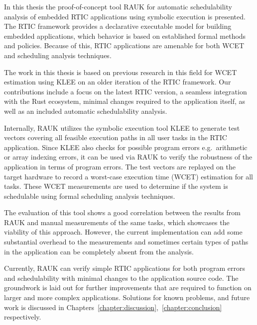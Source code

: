 In this thesis the proof-of-concept tool RAUK for automatic schedulability
analysis of embedded RTIC applications using symbolic execution is presented.
The RTIC framework provides a declarative executable model for building
embedded applications, which behavior is based on established formal methods
and policies. Because of this, RTIC applications are amenable for both WCET and
scheduling analysis techniques.

The work in this thesis is based on previous research in this field for WCET
estimation using KLEE on an older iteration of the RTIC framework. Our
contributions include a focus on the latest RTIC version, a seamless
integration with the Rust ecosystem, minimal changes required to the
application itself, as well as an included automatic schedulability analysis.

Internally, RAUK utilizes the symbolic execution tool KLEE to generate test vectors
covering all feasible execution paths in all user tasks in the RTIC
application. Since KLEE also checks for possible program errors e.g.\ arithmetic or
array indexing errors, it can be used via RAUK to verify the robustness of the
application in terms of program errors. The test vectors are replayed on the
target hardware to record a worst-case execution time (WCET) estimation for all
tasks. These WCET measurements are used to determine if the system is
schedulable using formal scheduling analysis techniques.

The evaluation of this tool shows a good correlation between the results from
RAUK and manual measurements of the same tasks, which showcases the viability
of this approach. However, the current implementation can add some substantial
overhead to the measurements and sometimes certain types of paths in the
application can be completely absent from the analysis.

Currently, RAUK can verify simple RTIC applications for both program errors and
schedulability with minimal changes to the application source code. The
groundwork is laid out for further improvements that are required to function
on larger and more complex applications. Solutions for known problems, and future work
is discussed in Chapters~\ref{chapter:discussion},~\ref{chapter:conclusion} respectively.
